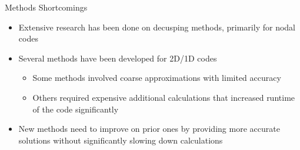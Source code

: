 
\begin{frame}[t]{Methods Shortcomings}
    
    \begin{itemize}
        \item Extensive research has been done on decusping methods, primarily for nodal codes
        \item Several methods have been developed for 2D/1D codes
        \begin{itemize}
            \item Some methods involved coarse approximations with limited accuracy
            \item Others required expensive additional calculations that increased runtime of the code significantly
        \end{itemize}
        \item New methods need to improve on prior ones by providing more accurate solutions without significantly slowing down calculations
    \end{itemize}

\end{frame}